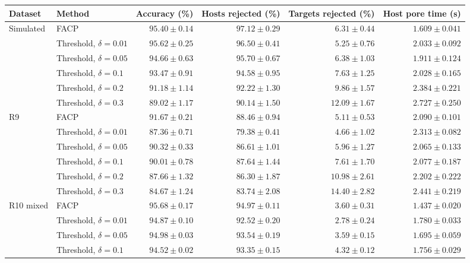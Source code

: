 \begingroup\setlength{\tabcolsep}{4pt}
\begin{tabular}{@{}llrrrr@{}}
\toprule
Dataset & Method & Accuracy (\%) & Hosts rejected (\%) & Targets rejected (\%) & Host pore time (s)\\\midrule
Simulated & FACP & $95.40 \pm 0.14$ & $\mathbf{97.12 \pm 0.29}$ & $6.31 \pm 0.44$ & $\mathbf{1.609 \pm 0.041}$\\
 & Threshold, $\delta=0.01$ & $\mathbf{95.62 \pm 0.25}$ & $96.50 \pm 0.41$ & $\mathbf{5.25 \pm 0.76}$ & $2.033 \pm 0.092$\\
 & Threshold, $\delta=0.05$ & $94.66 \pm 0.63$ & $95.70 \pm 0.67$ & $6.38 \pm 1.03$ & $1.911 \pm 0.124$\\
 & Threshold, $\delta=0.1$ & $93.47 \pm 0.91$ & $94.58 \pm 0.95$ & $7.63 \pm 1.25$ & $2.028 \pm 0.165$\\
 & Threshold, $\delta=0.2$ & $91.18 \pm 1.14$ & $92.22 \pm 1.30$ & $9.86 \pm 1.57$ & $2.384 \pm 0.221$\\
 & Threshold, $\delta=0.3$ & $89.02 \pm 1.17$ & $90.14 \pm 1.50$ & $12.09 \pm 1.67$ & $2.727 \pm 0.250$\\
\addlinespace
R9 & FACP & $\mathbf{91.67 \pm 0.21}$ & $\mathbf{88.46 \pm 0.94}$ & $5.11 \pm 0.53$ & $2.090 \pm 0.101$\\
 & Threshold, $\delta=0.01$ & $87.36 \pm 0.71$ & $79.38 \pm 0.41$ & $\mathbf{4.66 \pm 1.02}$ & $2.313 \pm 0.082$\\
 & Threshold, $\delta=0.05$ & $90.32 \pm 0.33$ & $86.61 \pm 1.01$ & $5.96 \pm 1.27$ & $\mathbf{2.065 \pm 0.133}$\\
 & Threshold, $\delta=0.1$ & $90.01 \pm 0.78$ & $87.64 \pm 1.44$ & $7.61 \pm 1.70$ & $2.077 \pm 0.187$\\
 & Threshold, $\delta=0.2$ & $87.66 \pm 1.32$ & $86.30 \pm 1.87$ & $10.98 \pm 2.61$ & $2.202 \pm 0.222$\\
 & Threshold, $\delta=0.3$ & $84.67 \pm 1.24$ & $83.74 \pm 2.08$ & $14.40 \pm 2.82$ & $2.441 \pm 0.219$\\
\addlinespace
R10 mixed & FACP & $\mathbf{95.68 \pm 0.17}$ & $\mathbf{94.97 \pm 0.11}$ & $3.60 \pm 0.31$ & $\mathbf{1.437 \pm 0.020}$\\
 & Threshold, $\delta=0.01$ & $94.87 \pm 0.10$ & $92.52 \pm 0.20$ & $\mathbf{2.78 \pm 0.24}$ & $1.780 \pm 0.033$\\
 & Threshold, $\delta=0.05$ & $94.98 \pm 0.03$ & $93.54 \pm 0.19$ & $3.59 \pm 0.15$ & $1.695 \pm 0.059$\\
 & Threshold, $\delta=0.1$ & $94.52 \pm 0.02$ & $93.35 \pm 0.15$ & $4.32 \pm 0.12$ & $1.756 \pm 0.029$\\

\end{tabular}

